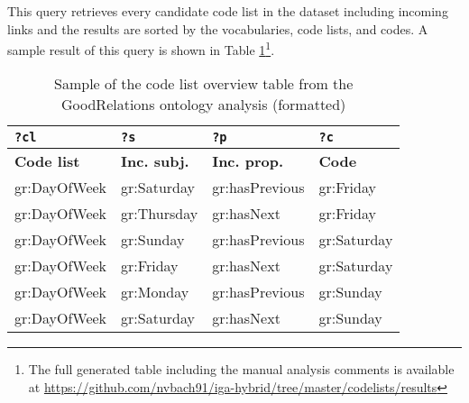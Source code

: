 This query retrieves every candidate code list in the dataset including incoming links and the results are sorted by the vocabularies, code lists, and codes. A sample result of this query is shown in Table \ref{tab:code-list-overview-results}\footnote{\label{full-code-list-table-overview}The full generated table including the manual analysis comments is available at \url{https://github.com/nvbach91/iga-hybrid/tree/master/codelists/results}}.

\begin{table}[ht]
\footnotesize
\centering
\begin{tabular}{|l|l|l|l|}
\hline
\textbf{\texttt{?cl}} & \textbf{\texttt{?s}} & \textbf{\texttt{?p}} & \textbf{\texttt{?c}} \\ \hline \hline
\textbf{Code list}    & \textbf{Inc. subj.}  & \textbf{Inc. prop.}  & \textbf{Code}        \\ \hline
gr:DayOfWeek          & gr:Saturday          & gr:hasPrevious       & gr:Friday            \\ \hline
gr:DayOfWeek          & gr:Thursday          & gr:hasNext           & gr:Friday            \\ \hline
gr:DayOfWeek          & gr:Sunday            & gr:hasPrevious       & gr:Saturday          \\ \hline
gr:DayOfWeek          & gr:Friday            & gr:hasNext           & gr:Saturday          \\ \hline
gr:DayOfWeek          & gr:Monday            & gr:hasPrevious       & gr:Sunday            \\ \hline
gr:DayOfWeek          & gr:Saturday          & gr:hasNext           & gr:Sunday            \\ \hline
\end{tabular}
\caption{Sample of the code list overview table from the GoodRelations ontology  analysis (formatted)} \label{tab:code-list-overview-results}
\end{table}


